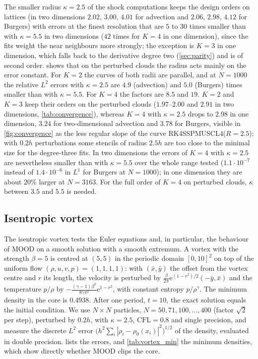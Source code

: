 \documentclass[11pt,a4paper]{article}
\numberwithin{equation}{section}
\newcommand{\CFL}{\mathrm{CFL}}
\begin{document}
The smaller radius $\kappa=2.5$ of the shock computations keeps the design orders on lattices (in two dimensions $2.02$, $3.00$, $4.01$ for advection and $2.06$, $2.98$, $4.12$ for Burgers) with errors at the finest resolution that are $5$ to $30$ times smaller than with $\kappa=5.5$ in two dimensions ($42$ times for $K=4$ in one dimension), since the fits weight the near neighbours more strongly; the exception is $K=3$ in one dimension, which falls back to the derivative degree two (\cref{sec:parity}) and is of second order.  shows that on the perturbed clouds the radius acts mainly on the error constant. For $K=2$ the curves of both radii are parallel, and at $N=1000$ the relative $L^2$ errors with $\kappa=2.5$ are $4.9$ (advection) and $5.0$ (Burgers) times smaller than with $\kappa=5.5$. For $K=4$ the factors are $8.5$ and $19$. $K=2$ and $K=3$ keep their orders on the perturbed clouds ($1.97$--$2.00$ and $2.91$ in two dimensions, \cref{tab:convergence}), whereas $K=4$ with $\kappa=2.5$ drops to $2.98$ in one dimension, $3.24$ for two-dimensional advection and $3.78$ for Burgers, visible in \cref{fig:convergence} as the less regular slope of the curve RK4SSPMUSCL4($R=2.5$): with $0.2h$ perturbations some stencils of radius $2.5h$ are too close to the minimal size for the degree-three fits. In two dimensions the errors of $K=4$ with $\kappa=2.5$ are nevertheless smaller than with $\kappa=5.5$ over the whole range tested ($1.1\cdot10^{-7}$ instead of $1.4\cdot10^{-6}$ in $L^1$ for Burgers at $N=1000$); in one dimension they are about $20\%$ larger at $N=3163$. For the full order of $K=4$ on perturbed clouds, $\kappa$ between $3.5$ and $5.5$ is needed.

\subsection{Isentropic vortex}\label{sec:vortex}

The isentropic vortex \cite{Shu1998} tests the Euler equations and, in particular, the behaviour of MOOD on a smooth solution with a smooth extremum. A vortex with the strength $\beta=5$ is centred at $(5,5)$ in the periodic domain $[0,10]^2$ on top of the uniform flow $(\rho,u,v,p)=(1,1,1,1)$: with $(\bar x,\bar y)$ the offset from the vortex centre and $r$ its length, the velocity is perturbed by $\frac{\beta}{2\pi}\mathrm{e}^{(1-r^2)/2}(-\bar y,\bar x)$ and the temperature $p/\rho$ by $-\frac{(\gamma-1)\beta^2}{8\gamma\pi^2}\mathrm{e}^{1-r^2}$, with constant entropy $p/\rho^\gamma$. The minimum density in the core is $0.4938$. After one period, $t=10$, the exact solution equals the initial condition. We use $N\times N$ particles, $N=50,71,100,\dots,400$ (factor $\sqrt2$ per step), perturbed by $0.2h$, with $\kappa=2.5$, $\CFL=0.8$ and single precision, and measure the discrete $L^2$ error $\big(h^2\sum_i|\rho_i-\rho_0(x_i)|^2\big)^{1/2}$ of the density, evaluated in double precision.  lists the errors, and \cref{tab:vortex_min} the minimum densities, which show directly whether MOOD clips the core.
\end{document}
